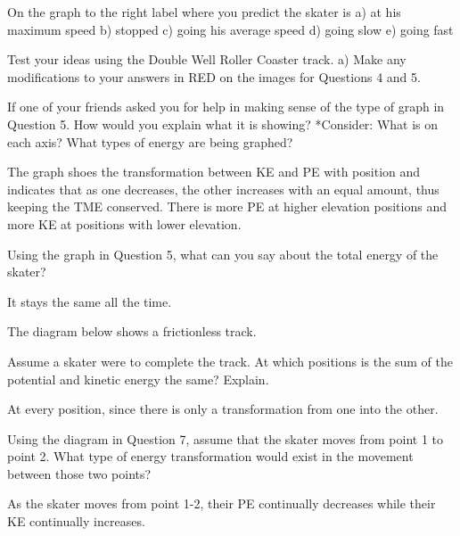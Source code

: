\documentclass[]{exam}
\begin{document}
\begin{questions}
\begin{questions}
\question
On the graph to the right label where you predict the skater is 
a) at his maximum speed
b) stopped
c) going his average speed
d) going slow
e) going fast

\question
Test your ideas using the Double Well Roller Coaster track. 
a) Make any modifications to your answers in RED on the images for Questions 4 and 5. 

\question
If one of your friends asked you for help in making sense of the type of graph in Question 5. How would you explain what it is showing? *Consider: What is on each axis?  What types of energy are being graphed?

\begin{solution}
    The graph shoes the transformation between KE and PE with position and indicates that as one decreases, the other increases with an equal amount, thus keeping the TME conserved. There is more PE at higher elevation positions and more KE at positions with lower elevation.
\end{solution}

\question
Using the graph in Question 5, what can you say about the total energy of the skater? 

\begin{solution}
      It stays the same all the time. 
\end{solution}


\question
The diagram below shows a frictionless track. 

Assume a skater were to complete the track. At which positions is the sum of the potential and kinetic energy the same? Explain. 

\begin{solution}
    At every position, since there is only a transformation from one into the other.
\end{solution}

\question
Using the diagram in Question 7, assume that the skater moves from point 1 to point 2. What type of energy transformation would exist in the movement between those two points?

\begin{solution}
    As the skater moves from point 1-2, their PE continually decreases while their KE continually increases.
\end{solution}
\end{questions}


\clearpage


\end{questions}
\end{document}
